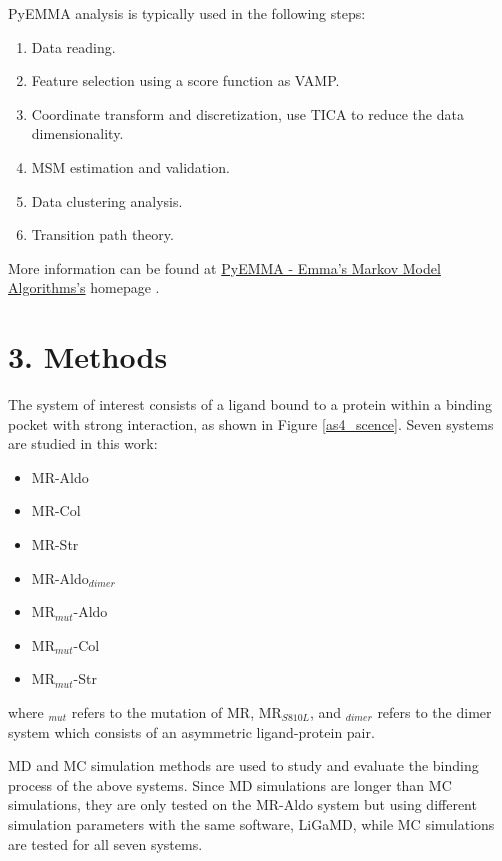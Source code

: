 \documentclass[
  journal=usp, %
  manuscript=final-report,
  year=2023,
  volume=1,
]{cup-journal}
\begin{document}
PyEMMA analysis is typically used in the following steps:

\begin{enumerate}
    \item Data reading.
    \item Feature selection using a score function as VAMP.
    \item Coordinate transform and discretization, use TICA to reduce the data dimensionality.
    \item MSM estimation and validation.
    \item Data clustering analysis.
    \item Transition path theory.
\end{enumerate}

More information can be found at \href{http://emma-project.org/latest/}{PyEMMA - Emma’s Markov Model Algorithms's} homepage \cite{pyemma}.

\section{3. Methods}

The system of interest consists of a ligand bound to a protein within a binding pocket with strong interaction, as shown in Figure \ref{as4_scence}. Seven systems are studied in this work:

\begin{multicols}{2}
\begin{itemize}
    \item MR-Aldo
    \item MR-Col
    \item MR-Str 
    \item MR-Aldo$_{dimer}$
    \item MR$_{mut}$-Aldo
    \item MR$_{mut}$-Col
    \item MR$_{mut}$-Str
\end{itemize}
\end{multicols}

\vspace{-10pt}
where $_{mut}$ refers to the mutation of MR, MR$_{S810L}$, and $_{dimer}$ refers to the dimer system which consists of an asymmetric ligand-protein pair.

MD and MC simulation methods are used to study and evaluate the binding process of the above systems. Since MD simulations are longer than MC simulations, they are only tested on the MR-Aldo system but using different simulation parameters with the same software, LiGaMD, while MC simulations are tested for all seven systems.
\end{document}
